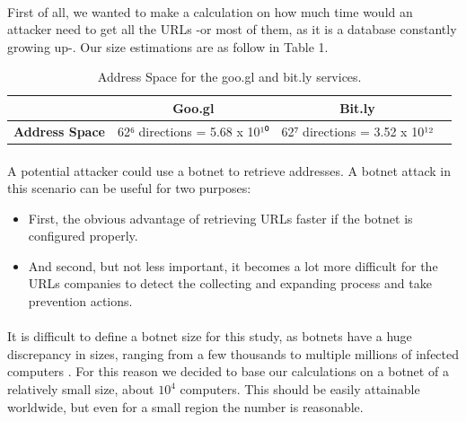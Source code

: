 \documentclass[12pt]{article}
\begin{document}
\paragraph{}
First of all, we wanted to make a calculation on how much time would an attacker need to get all the URLs -or most of them, as it is a database constantly growing up-. Our size estimations are as follow in Table 1.

\begin{table}[h]
	\centering
		\begin{tabular}{ | l | c | c | c |}
 			\hline
			  & \textbf{Goo.gl} & \textbf{Bit.ly} \\ \hline
 			\textbf{Address Space} & 62⁶ directions = 5.68 x 10¹⁰ & 62⁷ directions = 3.52 x 10¹² \\
 			\hline
  		\end{tabular}
	\caption[A table]{Address Space for the goo.gl and bit.ly services.}
	\label{tab:albums}
\end{table}

\paragraph{}
A potential attacker could use a botnet to retrieve addresses. A botnet attack in this scenario can be useful for two purposes:

\begin{itemize}

\item  First, the obvious advantage of retrieving URLs faster if the botnet is configured properly.

\item  And second, but not less important, it becomes a lot more difficult for the URLs companies to detect the collecting and expanding process and take prevention actions.

\end{itemize}

\paragraph{}
It is difficult to define a botnet size for this study, as botnets have a huge discrepancy in sizes, ranging from a few thousands to multiple millions of infected computers \cite{bots}. For this reason we decided to base our calculations on a botnet of a relatively small size, about $10^{4}$  computers. This should be easily attainable worldwide, but even for a small region the number is reasonable.
\end{document}
